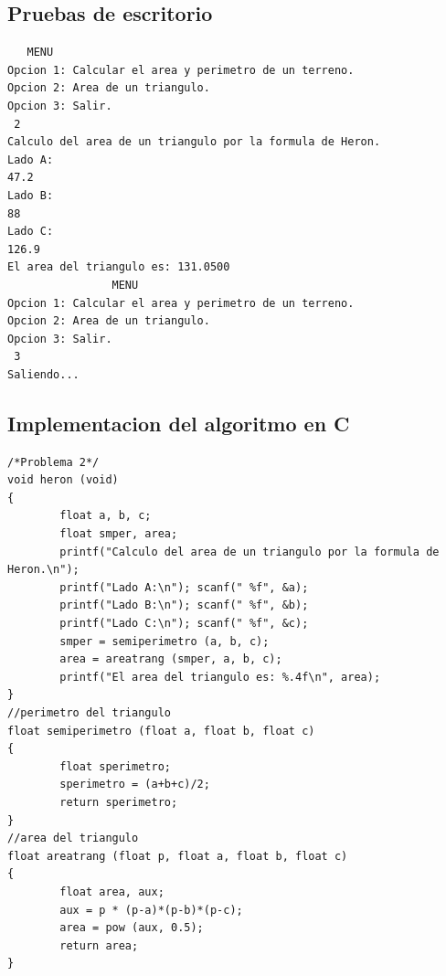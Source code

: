 \documentclass[12pt]{article}
\begin{document}
\subsection{Pruebas de escritorio }
\begin{verbatim}
   MENU
Opcion 1: Calcular el area y perimetro de un terreno.
Opcion 2: Area de un triangulo.
Opcion 3: Salir.
 2
Calculo del area de un triangulo por la formula de Heron.
Lado A:
47.2
Lado B:
88
Lado C:
126.9
El area del triangulo es: 131.0500
                MENU
Opcion 1: Calcular el area y perimetro de un terreno.
Opcion 2: Area de un triangulo.
Opcion 3: Salir.
 3
Saliendo...
\end{verbatim}

\subsection{Implementacion del algoritmo en C}
\begin{lstlisting}
/*Problema 2*/
void heron (void)
{
        float a, b, c;
        float smper, area;
        printf("Calculo del area de un triangulo por la formula de Heron.\n");
        printf("Lado A:\n"); scanf(" %f", &a);
        printf("Lado B:\n"); scanf(" %f", &b);
        printf("Lado C:\n"); scanf(" %f", &c);
        smper = semiperimetro (a, b, c);
        area = areatrang (smper, a, b, c);
        printf("El area del triangulo es: %.4f\n", area);
}
//perimetro del triangulo
float semiperimetro (float a, float b, float c)
{
        float sperimetro;
        sperimetro = (a+b+c)/2;
        return sperimetro;
}
//area del triangulo
float areatrang (float p, float a, float b, float c)
{
        float area, aux;
        aux = p * (p-a)*(p-b)*(p-c);
        area = pow (aux, 0.5);
        return area;
}

\end{lstlisting}
\end{document}
